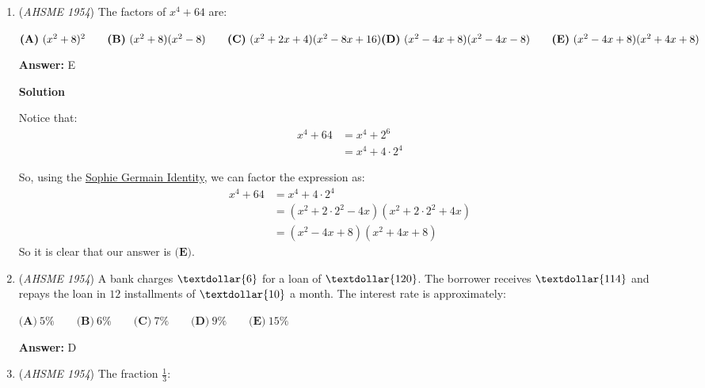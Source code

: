 \begin{enumerate}
 \textbf{Answer: }A



\textbf{Solution}

Since $\triangle ABC$ is an isosceles triangle, $\angle ABC = \angle ACB = 70^{\circ}$. Let $\angle OBC = \angle OCA = x$. Since $\angle ACB = 70$, $\angle OCB = 70 - x$. The angle of $\triangle OBC$ add up to $180$, so $\angle BOC = 180 - (x + 70 - x) = \boxed{\textbf{(A) } 110^{\circ}}$.

 


	\item (\textit{AHSME 1954}) The factors of $x^4+64$ are: 


 $\textbf{(A)}\ (x^2+8)^2\qquad\textbf{(B)}\ (x^2+8)(x^2-8)\qquad\textbf{(C)}\ (x^2+2x+4)(x^2-8x+16)\\ \textbf{(D)}\ (x^2-4x+8)(x^2-4x-8)\qquad\textbf{(E)}\ (x^2-4x+8)(x^2+4x+8)$

 \textbf{Answer: }E



\textbf{Solution}

Notice that: 
 \begin{align*} x^4+64  &= x^4+2^6 \\ 	&= x^4+4\cdot 2^4 \end{align*}


 So, using the \href{https://artofproblemsolving.com/wiki/index.php?title=Sophie\_Germain\_Identity}{Sophie Germain Identity}, we can factor the expression as:
 \begin{align*} x^4+64  & = x^4+4\cdot 2^4\\ 	& = (x^2+2\cdot2^2-4x)(x^2+2\cdot2^2+4x)\\         & = (x^2-4x+8)(x^2+4x+8) \end{align*}
So it is clear that our answer is $\boxed{\textbf{(E)}}$.

 


	\item (\textit{AHSME 1954}) A bank charges $\textdollar{6}$ for a loan of $\textdollar{120}$. The borrower receives $\textdollar{114}$ and 
repays the loan in $12$ installments of $\textdollar{10}$ a month. The interest rate is approximately: 


 $\textbf{(A)}\ 5 \% \qquad \textbf{(B)}\ 6 \% \qquad \textbf{(C)}\ 7 \% \qquad \textbf{(D)}\ 9\% \qquad \textbf{(E)}\ 15 \%$

 \textbf{Answer: }D


	\item (\textit{AHSME 1954}) The fraction $\frac{1}{3}$: 



\end{enumerate}
